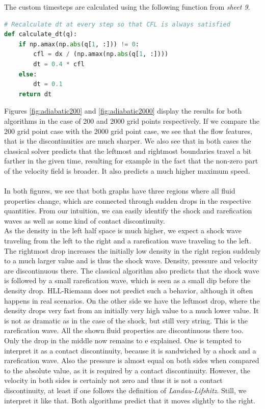 \documentclass{scrartcl}
\begin{document}
The custom timesteps are calculated using the following function from \textit{sheet 9}.
\begin{lstlisting}[title=Function to run the HLL-Riemann algorithm.,  language=Python, frame=single]
# Recalculate dt at every step so that CFL is always satisfied
def calculate_dt(q):
	if np.amax(np.abs(q[1, :])) != 0:
		cfl = dx / (np.amax(np.abs(q[1, :])))
		dt = 0.4 * cfl
	else:
		dt = 0.1
	return dt
\end{lstlisting}
Figures \ref{fig:adiabatic200} and \ref{fig:adiabatic2000} display the results for both algorithms in the case of 200 and 2000 grid points respectively.
If we compare the 200 grid point case with the 2000 grid point case, we see that the flow features, that is the discontinuities are much sharper.
We also see that in both cases the classical solver predicts that the leftmost and rightmost boundaries travel a bit farther in the given time, resulting for example in the fact that the non-zero part of the velocity field is broader. 
It also predicts a much higher maximum speed.\\\\
In both figures, we see that both graphs have three regions where all fluid properties change, which are connected through sudden drops in the respective quantities.
From our intuition, we can easily identify the shock and rarefication waves as well as some kind of contact discontinuity.\\
As the density in the left half space is much higher, we expect a shock wave traveling from the left to the right and a rarefication wave traveling to the left.
The rightmost drop increases the initially low density in the right region suddenly to a much larger value and is thus the shock wave. Density, pressure and velocity are discontinuous there.
The classical algorithm also predicts that the shock wave is followed by a small rarefication wave, which is seen as a small dip before the density drop.
HLL-Riemann does not predict such a behavior, although it often happens in real scenarios.
On the other side we have the leftmost drop, where the density drops very fast from an initially very high value to a much lower value. 
It is not as dramatic as in the case of the shock, but still very string. This is the rarefication wave.
All the shown fluid properties are discontinuous there too.\\
Only the drop in the middle now remains to e explained. 
One is tempted to interpret it as a contact discontinuity, because it is sandwiched by a shock and a rarefication wave.
Also the pressure is almost equal on both sides when compared to the absolute value, as it is required by a contact discontinuity.
However, the velocity in both sides is certainly not zero and thus it is not a contact discontinuity, at least if one follows the definition of \textit{Landau-Lifshitz}.
Still, we interpret it like that. 
Both algorithms predict that it moves slightly to the right. \\\\
\end{document}
